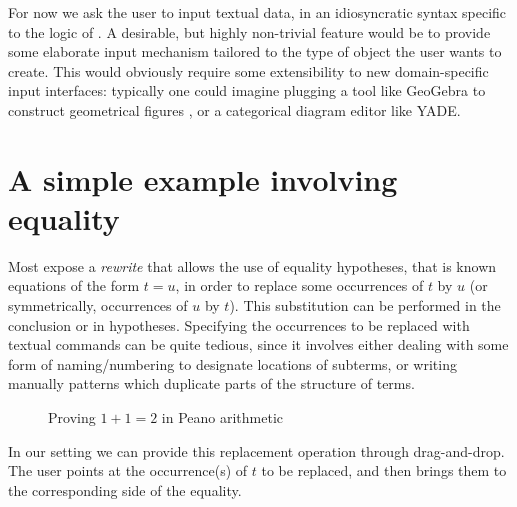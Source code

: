 For now we ask the user to input textual data, in an idiosyncratic syntax
specific to the logic of . A desirable, but highly non-trivial feature
would be to provide some elaborate input mechanism tailored to the type of
object the user wants to create. This would obviously require some extensibility
to new domain-specific input interfaces: typically one could imagine plugging a
tool like GeoGebra to construct geometrical figures , or a
categorical diagram editor like YADE.


\section{A simple example involving equality}

Most  expose a \emph{rewrite}  that allows the
use of equality hypotheses, that is known equations of the form $t = u$, in
order to replace some occurrences of $t$ by $u$ (or symmetrically, occurrences
of $u$ by $t$). This substitution can be performed in the conclusion or in
hypotheses. Specifying the occurrences to be replaced with textual commands can
be quite tedious, since it involves either dealing with some form of
naming/numbering to designate locations of subterms, or writing manually
patterns which duplicate parts of the structure of terms.

\begin{figure*}
  \begin{center}
  \end{center}
  \caption{Proving $1 + 1 = 2$ in Peano arithmetic}
\end{figure*}

In our setting we can provide this replacement operation through
drag-and-drop. The user points at the occurrence(s) of $t$ to be
replaced, and then brings them to the corresponding side of the
equality.

